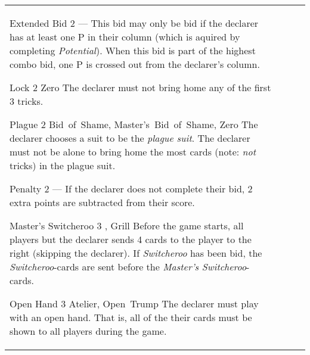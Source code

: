 \begin{table}
\begin{center}
\begin{tabularx}{\textwidth}{
			l
			S[table-number-alignment=center, table-figures-decimal=0]
			p{3cm}
			|X
		}
			\specialBidItem%
			{Extended Bid}
			{2}
			{---}
			{%
				This bid may only be bid if the declarer has at least one P in their column (which is aquired by completing \emph{Potential}). When this bid is part of the highest combo bid, one P is crossed out from the declarer's column.
			}

			\specialBidItem%
			{Lock}
			{2}
			{Zero}
			{%
				The declarer must not bring home any of the first 3 tricks.
			}

			\specialBidItem%
			{Plague}
			{2}
			{Bid~of~Shame, Master's~Bid~of~Shame, Zero}
			{%
				The declarer chooses a suit to be the \emph{plague suit}. The declarer must not be alone to bring home the most cards (note: \emph{not} tricks) in the plague suit.
			}

			\specialBidItem%
			{Penalty}
			{2}
			{---}
			{%
				If the declarer does not complete their bid, 2 extra points are subtracted from their score.
			}

			\specialBidItem%
			{Master's Switcheroo}
			{3}
			{\nonTrump, Grill}
			{%
				Before the game starts, all players but the declarer sends 4 cards to the player to the right (skipping the declarer). If \emph{Switcheroo} has been bid, the \emph{Switcheroo}-cards are sent before the \emph{Master's Switcheroo}-cards.
			}

			\specialBidItem%
			{Open Hand}
			{3}
			{Atelier, Open~Trump}
			{%
				The declarer must play with an open hand. That is, all of the their cards must be shown to all players during the game.
			}
		\end{tabularx}
	\end{center}
\end{table}

